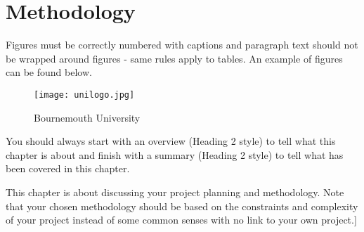 \chapter{Methodology}
\label{chap:methodology}
Figures must be correctly numbered with captions and paragraph text should not be wrapped around figures - same rules apply to tables. An example of figures can be found below.
\begin{figure}[t]
	\centering
	\texttt{[image: unilogo.jpg]}
	\caption{Bournemouth University}
	\label{fig:BULogo3}
\end{figure}
You should always start with an overview (Heading 2 style) to tell what this chapter is about and finish with a summary (Heading 2 style) to tell what has been covered in this chapter.

This chapter is about discussing your project planning and methodology. Note that your chosen methodology should be based on the constraints and complexity of your project instead of some common senses with no link to your own project.]
